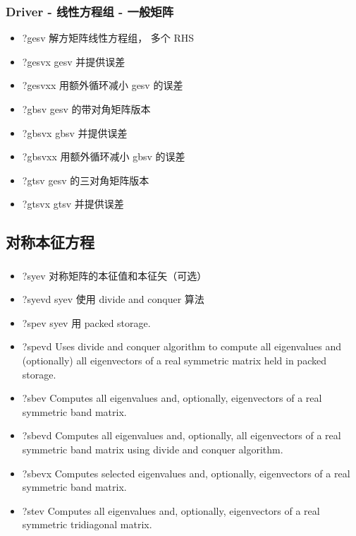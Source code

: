 \subsubsection{Driver - 线性方程组 - 一般矩阵}
\begin{itemize}
\item ?gesv 解方矩阵线性方程组， 多个 RHS
\item ?gesvx gesv 并提供误差
\item ?gesvxx 用额外循环减小 gesv 的误差
\item ?gbsv gesv 的带对角矩阵版本
\item ?gbsvx gbsv 并提供误差
\item ?gbsvxx 用额外循环减小 gbsv 的误差
\item ?gtsv gesv 的三对角矩阵版本
\item ?gtsvx gtsv 并提供误差
\end{itemize}


\subsection{对称本征方程}
\subsubsection{}
\begin{itemize}
\item ?syev 对称矩阵的本征值和本征矢（可选）
\item ?syevd syev 使用 divide and conquer 算法
\item ?spev syev 用 packed storage.
\item ?spevd Uses divide and conquer algorithm to compute all eigenvalues and (optionally) all eigenvectors of a real symmetric matrix held in packed storage.
\item ?sbev Computes all eigenvalues and, optionally, eigenvectors of a real symmetric band matrix.
\item ?sbevd Computes all eigenvalues and, optionally, all eigenvectors of a real symmetric band matrix using divide and conquer algorithm.
\item ?sbevx Computes selected eigenvalues and, optionally, eigenvectors of a real symmetric band matrix.
\item ?stev Computes all eigenvalues and, optionally, eigenvectors of a real symmetric tridiagonal matrix.
\end{itemize}

